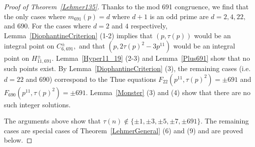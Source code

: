 \documentclass[12pt]{amsart}
\newcommand{\?}{\color{red}?}
\numberwithin{equation}{section}
\begin{document}
\begin{proof}[Proof of Theorem~\ref{Lehmer135}]
Thanks to the mod 691 congruence, we find that
the only cases where $m_{691}(p)=d$ where $d+1$ is an odd prime are $d=2, 4, 22,$ and $690$.
For the cases where $d=2$ and $4$ respectively, Lemma~\ref{DiophantineCriterion} (1-2) implies that
 $(p,\tau(p))$ would be an integral point on $C^{\pm}_{6,691},$ and that $(p, 2\tau(p)^2-3p^{11})$ would be an integral point on
 $H^{\pm}_{11,691}.$ Lemma~\ref{Hyper11_19} (2-3) and Lemma~\ref{Plus691} show that no such points exist.
By Lemma~\ref{DiophantineCriterion} (3), the remaining cases (i.e. $d=22$ and $690$)  correspond to the Thue equations
$F_{22}(p^{11},\tau(p)^2)=\pm 691$ and 
$F_{690}(p^{11},\tau(p)^2)=\pm 691.$
Lemma~\ref{Monster} (3) and (4) show that there are no such integer solutions.

The arguments above show that $\tau(n)\not \in \{\pm1 , \pm 3, \pm 5, \pm 7, \pm 691\}.$
The remaining cases are special cases of Theorem~\ref{LehmerGeneral} (6) and (9) and are  proved below.
\end{proof}
\end{document}
